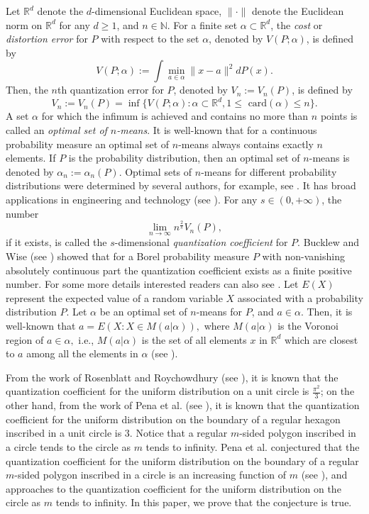 \documentclass[12pt]{amsart}
\theoremstyle{plain}
\theoremstyle{definition}
\newcommand{\sci}{\subset}%
\newcommand{\ga}{\alpha}
\newcommand{\tit}{\textit}%
\newcommand{\D}[1]{\mathbb{#1}}%
\begin{document}
Let $\D R^d$ denote the $d$-dimensional Euclidean space, $\|\cdot\|$ denote the Euclidean norm on $\D R^d$ for any $d\geq 1$, and $n\in \D N$. For a finite set $\ga\sci \D R^d$, the \tit{cost} or \tit{distortion error} for $P$ with respect to the set $\ga$, denoted by $V(P; \ga)$, is defined by
\[V(P; \ga):= \int \min_{a\in\alpha} \|x-a\|^2 dP(x).\]
Then, the $n$th quantization error for $P$, denoted by $V_n:=V_n(P)$, is defined by
\begin{equation*} \label{eq0} V_n:=V_n(P)=\inf \Big\{V(P; \ga) : \ga\sci \D R^d, 1\leq \text{ card}(\ga) \leq n \Big\}.\end{equation*}
A set $\ga$ for which the infimum is achieved and contains no more than $n$ points is called an \textit{optimal set of $n$-means}. It is well-known that for a continuous probability measure an optimal set of $n$-means always contains exactly $n$ elements. If $P$ is the probability distribution, then an optimal set of $n$-means is denoted by $\ga_n:=\ga_n(P)$. Optimal sets of $n$-means for different probability distributions were determined by several authors, for example, see \cite{CR1, CR2, DR1, DR2, GL2, L, R1, R2, R3, R4, R5, R6, RR1, RS}. It has broad applications in engineering and technology (see \cite{GG, GN, Z}). For any $s\in (0, +\infty)$, the number \[\lim_{n\to \infty} n^{\frac 2 s} V_n(P),\]
if it exists, is called the $s$-dimensional \tit{quantization coefficient} for $P$. Bucklew and Wise (see \cite{BW}) showed that for a Borel probability measure $P$ with non-vanishing absolutely continuous part the quantization coefficient exists as a finite positive number.
For some more details interested readers can also see \cite{GL1, P}.
Let $E(X)$ represent the expected value of a random variable $X$ associated with a probability distribution $P$. Let $\ga$ be an optimal set of $n$-means for $P$, and $a\in \ga$. Then, it is well-known that
$a=E(X : X \in M(a|\ga)),$
where $M(a|\ga)$ is the Voronoi region of $a\in \ga , $ i.e.,  $M(a|\ga)$ is the set of all elements $x$ in $\D R^d$ which are closest to $a$ among all the elements in $\ga$ (see \cite{GG, GL1}).


From the work of Rosenblatt and Roychowdhury (see \cite{RR2}), it is known that the quantization coefficient for the uniform distribution on a unit circle is $\frac {\pi^2}3$; on the other hand, from the work of Pena et al. (see \cite{PRRSS}), it is known that the quantization coefficient for the uniform distribution on the boundary of a regular hexagon inscribed in a unit circle is $3$. Notice that a regular $m$-sided polygon inscribed in a circle tends to the circle as $m$ tends to infinity. Pena et al. conjectured that the quantization coefficient for the uniform distribution on the boundary of a regular $m$-sided polygon inscribed in a circle is an increasing function of $m$ (see \cite{PRRSS}), and approaches to the quantization coefficient for the uniform distribution on the circle as $m$ tends to infinity. In this paper, we prove that the conjecture is true.
\end{document}
